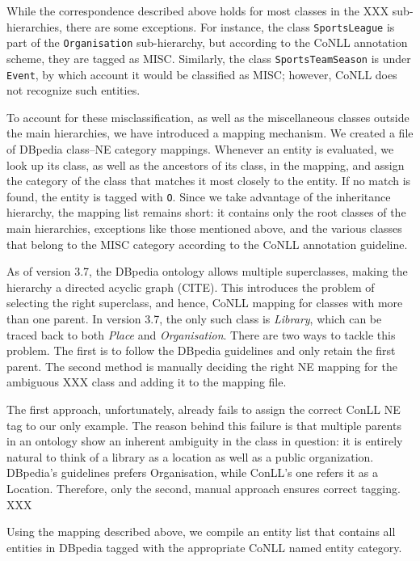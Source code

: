 \documentclass[11pt]{article}
\begin{document}
While the correspondence described above holds for most classes in the XXX sub-hierarchies, there are some exceptions. For instance, the class \texttt{SportsLeague} is part of the \texttt{Organisation} sub-hierarchy, but according to the CoNLL annotation scheme, they are tagged as MISC. Similarly, the class \texttt{SportsTeamSeason} is under \texttt{Event}, by which account it would be classified as MISC; however, CoNLL does not recognize such entities.

To account for these misclassification, as well as the miscellaneous classes outside the main hierarchies, we have introduced a mapping mechanism. We created a file of DBpedia class--NE category mappings. Whenever an entity is evaluated, we look up its class, as well as the ancestors of its class, in the mapping, and assign the category of the class that matches it most closely to the entity. If no match is found, the entity is tagged with \texttt{O}. Since we take advantage of the inheritance hierarchy, the mapping list remains short: it contains only the root classes of the main hierarchies, exceptions like those mentioned above, and the various classes that belong to the MISC category according to the CoNLL annotation guideline.

As of version 3.7, the DBpedia ontology allows multiple superclasses, making the hierarchy a directed acyclic graph (CITE). This introduces the problem of selecting the right superclass, and hence, CoNLL mapping for classes with more than one parent. In version 3.7, the only such class is \textit{Library}, which can be traced back to both \textit{Place} and \textit{Organisation}. There are two ways to tackle this problem. The first is to follow the DBpedia guidelines and only retain the first parent. The second method is manually deciding the right NE mapping for the ambiguous XXX class and adding it to the mapping file.

The first approach, unfortunately, already fails to assign the correct ConLL NE tag to our only example. The reason behind this failure is that multiple parents in an ontology show an inherent ambiguity in the class in question: it is entirely natural to think of a library as a location as well as a public organization. DBpedia's guidelines prefers Organisation, while ConLL's one refers it as a Location. Therefore, only the second, manual approach ensures correct tagging. XXX


Using the mapping described above, we compile an entity list that contains all entities in DBpedia tagged with the appropriate CoNLL named entity category.
\end{document}
